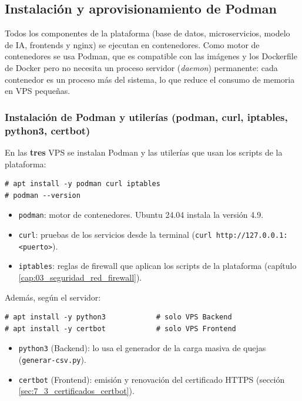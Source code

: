 \subsection{Instalación y aprovisionamiento de Podman}\label{sec:2_2_instalacion_podman}
Todos los componentes de la plataforma (base de datos, microservicios, modelo de IA, frontends y nginx) se ejecutan en contenedores. Como motor de contenedores se usa Podman, que es compatible con las imágenes y los Dockerfile de Docker pero no necesita un proceso servidor (\emph{daemon}) permanente: cada contenedor es un proceso más del sistema, lo que reduce el consumo de memoria en VPS pequeñas.

\subsubsection{Instalación de Podman y utilerías (podman, curl, iptables, python3, certbot)}
En las \textbf{tres} VPS se instalan Podman y las utilerías que usan los scripts de la plataforma:
\begin{lstlisting}
# apt install -y podman curl iptables
# podman --version
\end{lstlisting}
\begin{itemize}
  \item \texttt{podman}: motor de contenedores. Ubuntu 24.04 instala la versión 4.9.
  \item \texttt{curl}: pruebas de los servicios desde la terminal (\texttt{curl http://127.0.0.1:<puerto>}).
  \item \texttt{iptables}: reglas de firewall que aplican los scripts de la plataforma (capítulo \ref{cap:03_seguridad_red_firewall}).
\end{itemize}

Además, según el servidor:
\begin{lstlisting}
# apt install -y python3            # solo VPS Backend
# apt install -y certbot            # solo VPS Frontend
\end{lstlisting}
\begin{itemize}
  \item \texttt{python3} (Backend): lo usa el generador de la carga masiva de quejas (\texttt{generar-csv.py}).
  \item \texttt{certbot} (Frontend): emisión y renovación del certificado HTTPS (sección \ref{sec:7_3_certificados_certbot}).
\end{itemize}


